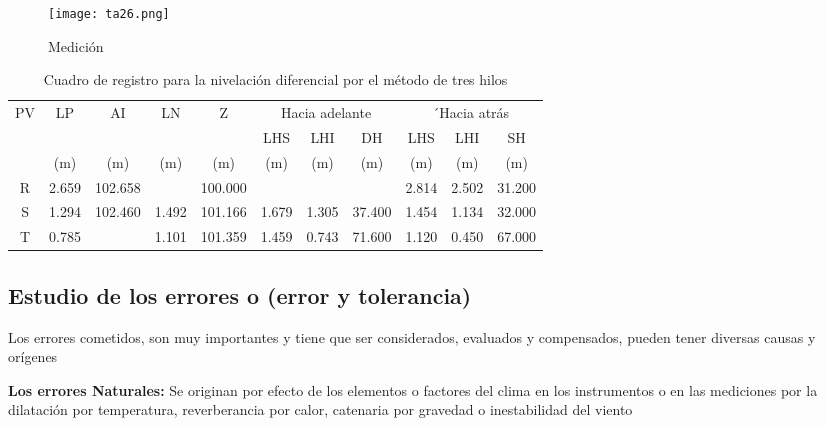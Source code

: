 \begin{figure}[h!]
  \centerline{\texttt{[image: ta26.png]}}
  \caption{Medición}
  \label{ta26}
\end{figure}

\begin{table}[h!]
    \centering\begin{tabular}{@{}ccccccccccc@{}}
    \toprule
    \multirow{3}{*}{PV} & \multirow{2}{*}{LP} & \multirow{2}{*}{AI} & \multirow{2}{*}{LN} & \multirow{2}{*}{Z} & \multicolumn{3}{c}{Hacia adelante} & \multicolumn{3}{c}{´Hacia atrás} \\
                        &                     &                     &                     &                    & LHS       & LHI       & DH         & LHS       & LHI      & SH        \\
                        & (m)                 & (m)                 & (m)                 & (m)                & (m)       & (m)       & (m)        & (m)       & (m)      & (m)       \\ \midrule
    R                   & 2.659               & 102.658             &                     & 100.000            &           &           &            & 2.814     & 2.502    & 31.200    \\
    S                   & 1.294               & 102.460             & 1.492               & 101.166            & 1.679     & 1.305     & 37.400     & 1.454     & 1.134    & 32.000    \\
    T                   & 0.785               &                     & 1.101               & 101.359            & 1.459     & 0.743     & 71.600     & 1.120     & 0.450    & 67.000    \\ \bottomrule
    \end{tabular}
    \caption{Cuadro de registro para la nivelación diferencial por el método de tres hilos}
    \label{tabta7}
\end{table}

\subsection{Estudio de los errores o (error y tolerancia)}

Los errores cometidos, son muy importantes y tiene que ser considerados, evaluados y compensados, pueden tener diversas causas y orígenes

\begin{example}
    \textbf{Los errores Naturales:} Se originan por efecto de los elementos o factores del clima en los instrumentos o en las mediciones por la dilatación por temperatura, reverberancia por calor, catenaria por gravedad o inestabilidad del viento
\end{example}

